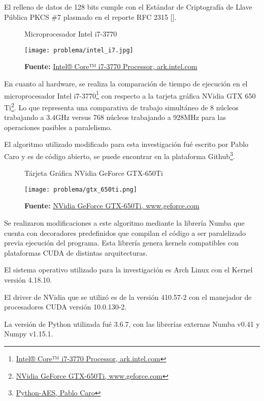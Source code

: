 \documentclass[../main/main.tex]{subfiles}
\begin{document}
  El relleno de datos de 128 bits cumple con el Estándar de Criptografía de Llave Pública PKCS \#7 plasmado en el reporte RFC 2315 [\cite{report:RFC_2315}].

  \begin{figure}[H]
    \centering
    \caption{Microprocesador Intel i7-3770}
    \texttt{[image: problema/intel\_i7.jpg]}
    \caption*{\textbf{Fuente:} \href{https://tinyurl.com/yb3tqpvu}{Intel® Core™ i7-3770 Processor, ark.intel.com}}
  \end{figure}

  En cuanto al hardware, se realiza la comparación de tiempo de ejecución en el microprocesador Intel i7-3770\footnote{\href{https://tinyurl.com/yb3tqpvu}{Intel® Core™ i7-3770 Processor, ark.intel.com}} con respecto a la tarjeta gráfica NVidia GTX 650 Ti\footnote{\href{https://tinyurl.com/ycr3kouv}{NVidia GeForce GTX-650Ti, www.geforce.com}}. Lo que representa una comparativa de trabajo simultáneo de 8 núcleos trabajando a 3.4GHz versus 768 núcleos trabajando a 928MHz para las operaciones pasibles a paralelismo.

  El algoritmo utilizado modificado para esta investigación fué escrito por Pablo Caro y es de código abierto, se puede encontrar en la plataforma Github\footnote{\href{https://github.com/pcaro90/Python-AES}{Python-AES, Pablo Caro}}.

  \begin{figure}[H]
    \centering
    \caption{Tárjeta Gráfica NVidia GeForce GTX-650Ti}
    \texttt{[image: problema/gtx\_650ti.png]}
    \caption*{\textbf{Fuente:} \href{https://tinyurl.com/ycr3kouv}{NVidia GeForce GTX-650Ti, www.geforce.com}}
  \end{figure}

  Se realizaron modificaciones a este algoritmo mediante la librería Numba que cuenta con decoradores predefinidos que compilan el código a ser paralelizado previa ejecución del programa. Esta librería genera kernels compatibles con plataformas CUDA de distintas arquitecturas.

  El sistema operativo utilizado para la investigación es Arch Linux con el Kernel versión 4.18.10.
  
  El driver de NVidia que se utilizó es de la versión 410.57-2 con el manejador de procesadores CUDA versión 10.0.130-2.

  La versión de Python utilizada fué 3.6.7, con las librerías externas Numba v0.41 y Numpy v1.15.1.

  \printbibliography
\end{document}
